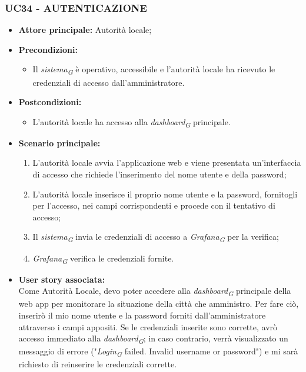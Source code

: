 \subsubsection{UC34 - AUTENTICAZIONE}
\begin{itemize}
    \item \textbf{Attore principale:} Autorità locale;
    \item \textbf{Precondizioni:}
        \begin{itemize}
            \item Il \textit{sistema}\textsubscript{\textit{G}} è operativo, accessibile e l’autorità locale ha ricevuto le credenziali di accesso dall'amministratore.
        \end{itemize}
    \item \textbf{Postcondizioni:}
        \begin{itemize}
            \item L’autorità locale ha accesso alla \textit{dashboard}\textsubscript{\textit{G}} principale.
        \end{itemize}
    \item \textbf{Scenario principale:}
        \begin{enumerate}
            \item L'autorità locale avvia l'applicazione web e viene presentata un'interfaccia di accesso che richiede l'inserimento del nome utente e della password;
            \item L'autorità locale inserisce il proprio nome utente e la password, fornitogli per l’accesso, nei campi corrispondenti e procede con il tentativo di accesso;
            \item Il \textit{sistema}\textsubscript{\textit{G}} invia le credenziali di accesso a \textit{Grafana}\textsubscript{\textit{G}} per la verifica;
            \item \textit{Grafana}\textsubscript{\textit{G}} verifica le credenziali fornite.
        \end{enumerate}
    \item \textbf{User story associata:} \\
    Come Autorità Locale, devo poter accedere alla \textit{dashboard}\textsubscript{\textit{G}} principale della web app per monitorare la situazione della città che amministro. Per fare ciò, inserirò il mio nome utente e la password forniti dall'amministratore attraverso i campi appositi. Se le credenziali inserite sono corrette, avrò accesso immediato alla \textit{dashboard}\textsubscript{\textit{G}}; in caso contrario, verrà visualizzato un messaggio di errore ("\textit{Login}\textsubscript{\textit{G}} failed. Invalid username or password") e mi sarà richiesto di reinserire le credenziali corrette.
\end{itemize}
